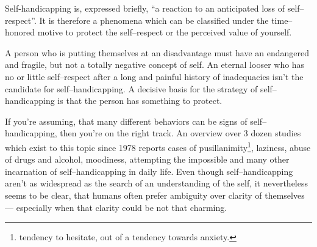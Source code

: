 \documentclass[../main.tex]{subfiles}
\begin{document}
{  Self-handicapping is, expressed briefly, ``a reaction to an anticipated loss of self--respect''.
  It is therefore a phenomena which can be classified under the time--honored motive to protect the self--respect or the perceived value of yourself.

  A person who is putting themselves at an disadvantage must have an endangered and fragile, but not a totally negative concept of self.
  An eternal looser who has no or little self--respect after a long and painful history of inadequacies isn't the candidate for self--handicapping.
  A decisive basis for the strategy of self--handicapping is that the person has something to protect.

  If you're assuming, that many different behaviors can be signs of self--handicapping, then you're on the right track.
  An overview over 3 dozen studies which exist to this topic since 1978 reports cases of pusillanimity\footnote{tendency to hesitate, out of a tendency towards anxiety.},
  laziness, abuse of drugs and alcohol, moodiness, attempting the impossible and many other incarnation of self--handicapping in daily life.
  Even though self--handicapping aren't as widespread as the search of an understanding of the self,
  it nevertheless seems to be clear, that humans often prefer ambiguity over clarity of themselves ---
  especially when that clarity could be not that charming.
}
\end{document}
